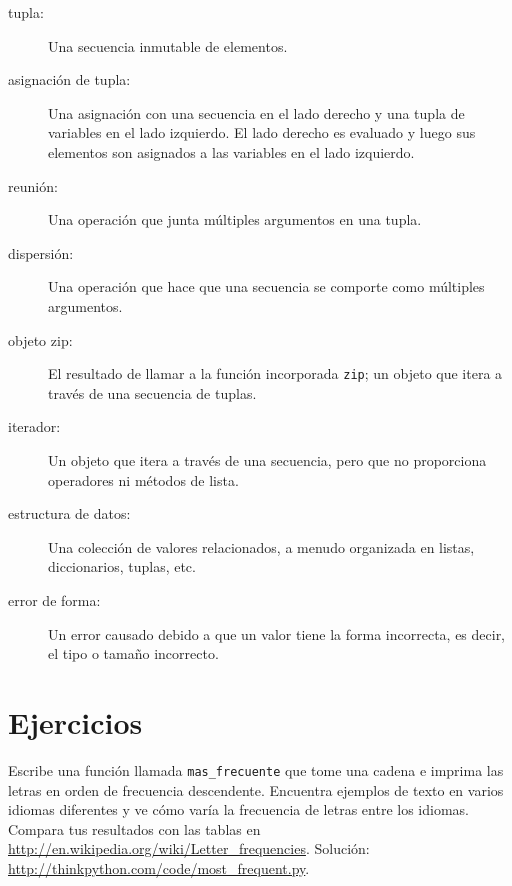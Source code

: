 \documentclass[10pt]{book}
\begin{document}
\begin{description}

\item[tupla:] Una secuencia inmutable de elementos.

\item[asignación de tupla:] Una asignación con una secuencia en el
lado derecho y una tupla de variables en el lado izquierdo.  El lado
derecho es evaluado y luego sus elementos son asignados a las
variables en el lado izquierdo.

\item[reunión:] Una operación que junta múltiples argumentos en una tupla.

\item[dispersión:] Una operación que hace que una secuencia se comporte como múltiples argumentos.

\item[objeto zip:] El resultado de llamar a la función incorporada {\tt zip};
un objeto que itera a través de una secuencia de tuplas.

\item[iterador:] Un objeto que itera a través de una secuencia, pero
que no proporciona operadores ni métodos de lista.

\item[estructura de datos:] Una colección de valores relacionados, a menudo
organizada en listas, diccionarios, tuplas, etc.

\item[error de forma:] Un error causado debido a que un valor tiene la forma
incorrecta, es decir, el tipo o tamaño incorrecto.

\end{description}


\section{Ejercicios}

\begin{exercise}

Escribe una función llamada \verb"mas_frecuente" que tome una cadena e
imprima las letras en orden de frecuencia descendente.  Encuentra ejemplos
de texto en varios idiomas diferentes y ve cómo varía la frecuencia de letras
entre los idiomas.  Compara tus resultados con las tablas en
\url{http://en.wikipedia.org/wiki/Letter_frequencies}.  Solución:
\url{http://thinkpython.com/code/most_frequent.py}.   

\end{exercise}
\end{document}
